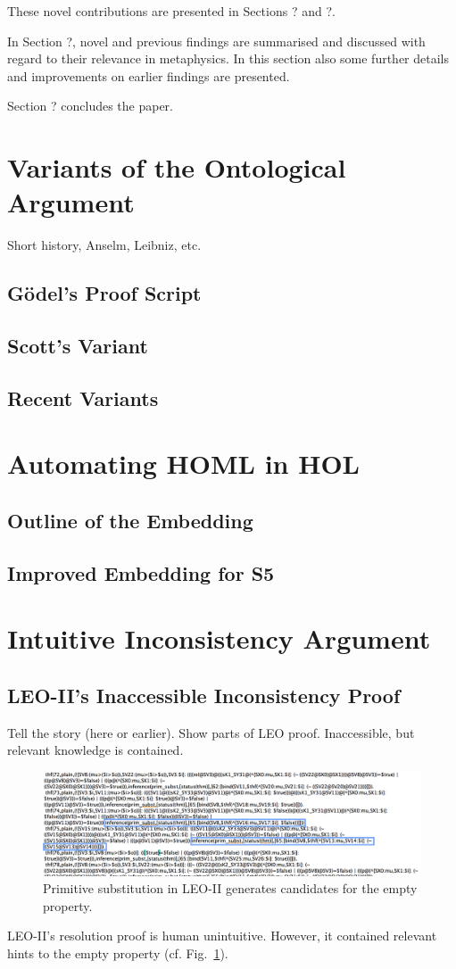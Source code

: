 \documentclass{article}
\begin{document}
These novel contributions are presented in Sections ? and ?.

In Section ?, novel and previous findings are summarised and discussed 
with regard to their relevance in metaphysics. In this section also 
some further details and improvements on earlier 
findings are presented.

Section ? concludes the paper.



\section{Variants of the Ontological Argument}
Short history, Anselm, Leibniz, etc.
\subsection{G\"{o}del's Proof Script}
\subsection{Scott's Variant}
\subsection{Recent Variants}

\section{Automating HOML in HOL}
\subsection{Outline of the Embedding}
\subsection{Improved Embedding for S5}

\section{Intuitive Inconsistency Argument}
\subsection{LEO-II's Inaccessible Inconsistency Proof}
Tell the story (here or earlier). Show parts of LEO proof.  Inaccessible, but relevant knowledge
is contained.
\begin{figure}
\centerline{\includegraphics[width=\textwidth]{./Images/LEO-Proof.png}}
\caption{Primitive substitution in LEO-II generates candidates for the
empty property.} \label{LEO-Proof}
\end{figure}
LEO-II's resolution proof is human unintuitive. However, it contained
relevant hints to the empty property (cf. Fig.~\ref{LEO-Proof}).
\end{document}
